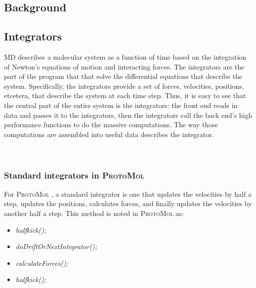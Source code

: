 \documentclass[11pt]{report}
\newcommand{\ProtoMol}{\textsc{ProtoMol }}
\begin{document}
\begin{appendix}

\chapter{Background}

\section{Integrators}

MD describes a molecular system as a function of time based on the
integration of Newton's equations of motion and interacting forces.  The
integrators are the part of the program that that solve the differential
equations that describe the system.  Specifically, the integrators provide a set of
forces, velocities, positions, etcetera, that describe the system at each
time step.  Thus, it is easy to see that the central part of the entire
system is the integrators:  the front end reads in data and passes it to
the integrators, then the integrators call the back end's high performance
functions to do the massive computations.  The way those computations are
assembled into useful data describes the integrator. \\ \\ \\

\subsection{Standard integrators in \ProtoMol}
\label{sec:standardintegrator}

For \ProtoMol, a standard integrator is one that updates the velocities by half a step, updates the positions, calculates forces, and finally updates the velocities by another half a step.  This method is noted in \ProtoMol as:
\begin{itemize}
\item \textit{ halfkick();}
\item \textit{ doDriftOrNextIntegrator();}
\item \textit{ calculateForces();}
\item \textit{ halfkick();}
\end{itemize}


\end{appendix}
\end{document}
